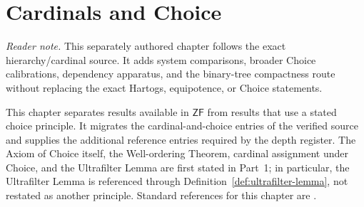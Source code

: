 

\chapter{Cardinals and Choice}
\label{sec:p06-cardinals-choice}

\noindent\textit{Reader note.}  This separately authored chapter follows the
exact hierarchy/cardinal source.  It adds system comparisons, broader Choice
calibrations, dependency apparatus, and the binary-tree compactness route
without replacing the exact Hartogs, equipotence, or Choice statements.

This chapter separates results available in \(\mathsf{ZF}\) from results
that use a stated choice principle.  It migrates the cardinal-and-choice
entries of the verified source and supplies the additional reference entries
required by the depth register.  The Axiom of Choice itself, the Well-ordering
Theorem, cardinal assignment under Choice, and the Ultrafilter Lemma are first
stated in Part~1; in particular, the Ultrafilter Lemma is referenced through
Definition~\ref{def:ultrafilter-lemma}, not restated as another principle.
Standard references for this chapter are
\cite{Jech2003,Jech1973Choice,HowardRubin1998,Kunen2011}.

